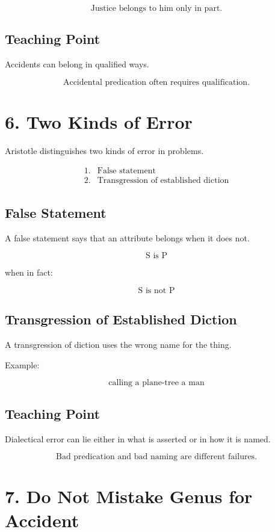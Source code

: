 \documentclass[12pt]{article}
\begin{document}
\[
\text{Justice belongs to him only in part.}
\]

\subsection*{Teaching Point}

Accidents can belong in qualified ways.

\[
\boxed{
\text{Accidental predication often requires qualification.}
}
\]

\section*{6. Two Kinds of Error}

Aristotle distinguishes two kinds of error in problems.

\[
\begin{array}{ll}
1. & \text{False statement} \\
2. & \text{Transgression of established diction}
\end{array}
\]

\subsection*{False Statement}

A false statement says that an attribute belongs when it does not.

\[
\text{S is P}
\]

when in fact:

\[
\text{S is not P}
\]

\subsection*{Transgression of Established Diction}

A transgression of diction uses the wrong name for the thing.

Example:

\[
\text{calling a plane-tree a man}
\]

\subsection*{Teaching Point}

Dialectical error can lie either in what is asserted or in how it is named.

\[
\boxed{
\text{Bad predication and bad naming are different failures.}
}
\]

\section*{7. Do Not Mistake Genus for Accident}
\end{document}
